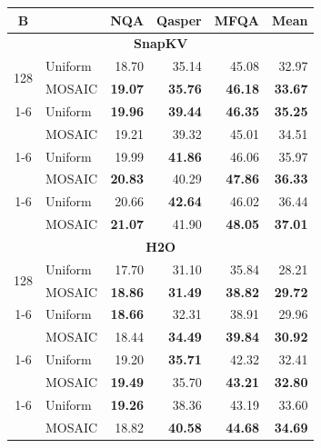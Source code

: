 \begin{table}[tp]
  \centering
  \scriptsize
  \setlength{\tabcolsep}{5pt}
  \renewcommand{\arraystretch}{0.92}
  \begin{tabular}{@{} c l rrrr @{}}
    \toprule
    \textbf{B} & & \textbf{NQA} & \textbf{Qasper} & \textbf{MFQA} & \textbf{Mean} \\
    \midrule
    \multicolumn{6}{c}{\textbf{SnapKV}} \\
    \midrule
    \multirow{2}{*}{128} & Uniform & 18.70 & 35.14 & 45.08 & 32.97 \\
     & MOSAIC & \textbf{19.07} & \textbf{35.76} & \textbf{46.18} & \textbf{33.67} \\
    \cmidrule(l){1-6}
    \multirow{2}{*}{256} & Uniform & \textbf{19.96} & \textbf{39.44} & \textbf{46.35} & \textbf{35.25} \\
     & MOSAIC & 19.21 & 39.32 & 45.01 & 34.51 \\
    \cmidrule(l){1-6}
    \multirow{2}{*}{512} & Uniform & 19.99 & \textbf{41.86} & 46.06 & 35.97 \\
     & MOSAIC & \textbf{20.83} & 40.29 & \textbf{47.86} & \textbf{36.33} \\
    \cmidrule(l){1-6}
    \multirow{2}{*}{1024} & Uniform & 20.66 & \textbf{42.64} & 46.02 & 36.44 \\
     & MOSAIC & \textbf{21.07} & 41.90 & \textbf{48.05} & \textbf{37.01} \\
    \midrule
    \multicolumn{6}{c}{\textbf{H2O}} \\
    \midrule
    \multirow{2}{*}{128} & Uniform & 17.70 & 31.10 & 35.84 & 28.21 \\
     & MOSAIC & \textbf{18.86} & \textbf{31.49} & \textbf{38.82} & \textbf{29.72} \\
    \cmidrule(l){1-6}
    \multirow{2}{*}{256} & Uniform & \textbf{18.66} & 32.31 & 38.91 & 29.96 \\
     & MOSAIC & 18.44 & \textbf{34.49} & \textbf{39.84} & \textbf{30.92} \\
    \cmidrule(l){1-6}
    \multirow{2}{*}{512} & Uniform & 19.20 & \textbf{35.71} & 42.32 & 32.41 \\
     & MOSAIC & \textbf{19.49} & 35.70 & \textbf{43.21} & \textbf{32.80} \\
    \cmidrule(l){1-6}
    \multirow{2}{*}{1024} & Uniform & \textbf{19.26} & 38.36 & 43.19 & 33.60 \\
     & MOSAIC & 18.82 & \textbf{40.58} & \textbf{44.68} & \textbf{34.69} \\
    \midrule

\end{tabular}
\end{table}
